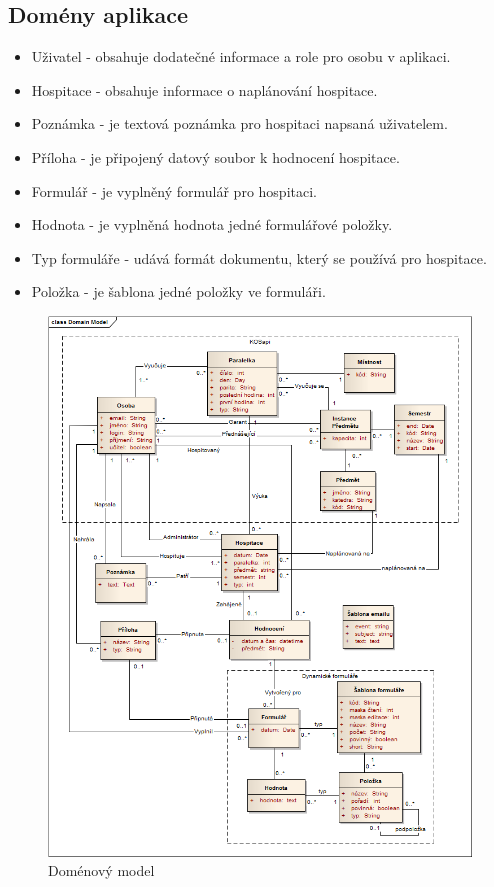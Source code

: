 \subsection{Domény aplikace}
\begin{itemize}
\item Uživatel - obsahuje dodatečné informace a role pro osobu v aplikaci.
\item Hospitace - obsahuje informace o naplánování hospitace. 
\item Poznámka - je textová poznámka pro hospitaci napsaná uživatelem.
\item Příloha - je připojený datový soubor k hodnocení hospitace.
\item Formulář - je vyplněný formulář pro hospitaci.
\item Hodnota - je vyplněná hodnota jedné formulářové položky.
\item Typ formuláře - udává formát dokumentu, který se používá pro hospitace. 
\item Položka - je šablona jedné položky ve formuláři.
\end{itemize}

\begin{figure}[h]
\begin{center}
\includegraphics[width=14cm]{figures/DomainModel2}
\caption{Doménový model}
\label{fig:domainmodel}
\end{center}
\end{figure}

